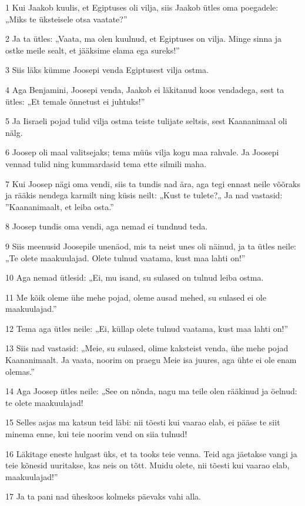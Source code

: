 \par 1 Kui Jaakob kuulis, et Egiptuses oli vilja, siis Jaakob ütles oma poegadele: „Miks te üksteisele otsa vaatate?”
\par 2 Ja ta ütles: „Vaata, ma olen kuulnud, et Egiptuses on vilja. Minge sinna ja ostke meile sealt, et jääksime elama ega sureks!”
\par 3 Siis läks kümme Joosepi venda Egiptusest vilja ostma.
\par 4 Aga Benjamini, Joosepi venda, Jaakob ei läkitanud koos vendadega, sest ta ütles: „Et temale õnnetust ei juhtuks!”
\par 5 Ja Iisraeli pojad tulid vilja ostma teiste tulijate seltsis, sest Kaananimaal oli nälg.
\par 6 Joosep oli maal valitsejaks; tema müüs vilja kogu maa rahvale. Ja Joosepi vennad tulid ning kummardasid tema ette silmili maha.
\par 7 Kui Joosep nägi oma vendi, siis ta tundis nad ära, aga tegi ennast neile võõraks ja rääkis nendega karmilt ning küsis neilt: „Kust te tulete?„ Ja nad vastasid: ”Kaananimaalt, et leiba osta.”
\par 8 Joosep tundis oma vendi, aga nemad ei tundnud teda.
\par 9 Siis meenusid Joosepile unenäod, mis ta neist unes oli näinud, ja ta ütles neile: „Te olete maakuulajad. Olete tulnud vaatama, kust maa lahti on!”
\par 10 Aga nemad ütlesid: „Ei, mu isand, su sulased on tulnud leiba ostma.
\par 11 Me kõik oleme ühe mehe pojad, oleme ausad mehed, su sulased ei ole maakuulajad.”
\par 12 Tema aga ütles neile: „Ei, küllap olete tulnud vaatama, kust maa lahti on!”
\par 13 Siis nad vastasid: „Meie, su sulased, olime kaksteist venda, ühe mehe pojad Kaananimaalt. Ja vaata, noorim on praegu Meie isa juures, aga ühte ei ole enam olemas.”
\par 14 Aga Joosep ütles neile: „See on nõnda, nagu ma teile olen rääkinud ja öelnud: te olete maakuulajad!
\par 15 Selles asjas ma katsun teid läbi: nii tõesti kui vaarao elab, ei pääse te siit minema enne, kui teie noorim vend on siia tulnud!
\par 16 Läkitage eneste hulgast üks, et ta tooks teie venna. Teid aga jäetakse vangi ja teie kõnesid uuritakse, kas neis on tõtt. Muidu olete, nii tõesti kui vaarao elab, maakuulajad!”
\par 17 Ja ta pani nad üheskoos kolmeks päevaks vahi alla.
